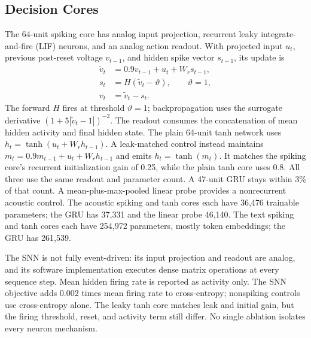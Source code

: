 \documentclass[conference]{IEEEtran}
\begin{document}
\subsection{Decision Cores}
The 64-unit spiking core has analog input projection, recurrent leaky integrate-and-fire (LIF) neurons, and an analog action readout. With projected input $u_t$, previous post-reset voltage $v_{t-1}$, and hidden spike vector $s_{t-1}$, its update is
\begin{equation}
\begin{aligned}
\tilde v_t&=0.9v_{t-1}+u_t+W_rs_{t-1},\\
s_t&=H(\tilde v_t-\vartheta),\qquad \vartheta=1,\\
v_t&=\tilde v_t-s_t.
\end{aligned}
\end{equation}
The forward $H$ fires at threshold $\vartheta=1$; backpropagation uses the surrogate derivative $(1+5|\tilde v_t-1|)^{-2}$. The readout consumes the concatenation of mean hidden activity and final hidden state. The plain 64-unit tanh network uses $h_t=\tanh(u_t+W_rh_{t-1})$. A leak-matched control instead maintains $m_t=0.9m_{t-1}+u_t+W_rh_{t-1}$ and emits $h_t=\tanh(m_t)$. It matches the spiking core's recurrent initialization gain of 0.25, while the plain tanh core uses 0.8. All three use the same readout and parameter count. A 47-unit GRU stays within 3\% of that count. A mean-plus-max-pooled linear probe provides a nonrecurrent acoustic control. The acoustic spiking and tanh cores each have 36,476 trainable parameters; the GRU has 37,331 and the linear probe 46,140. The text spiking and tanh cores each have 254,972 parameters, mostly token embeddings; the GRU has 261,539.

The SNN is not fully event-driven: its input projection and readout are analog, and its software implementation executes dense matrix operations at every sequence step. Mean hidden firing rate is reported as activity only. The SNN objective adds $0.002$ times mean firing rate to cross-entropy; nonspiking controls use cross-entropy alone. The leaky tanh core matches leak and initial gain, but the firing threshold, reset, and activity term still differ. No single ablation isolates every neuron mechanism.
\end{document}
